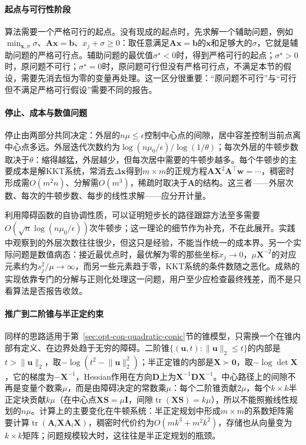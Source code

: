 \paragraph{起点与可行性阶段}
算法需要一个严格可行的起点。没有现成的起点时，先求解一个辅助问题，例如$\min_{\bm x,\sigma}\sigma$、$\bm A\bm x=\bm b$、$x_j+\sigma\geq0$：取任意满足$\bm A\bm x=\bm b$的$\bm x$和足够大的$\sigma$，它就是辅助问题的严格可行点。辅助问题的最优值$\sigma^\star<0$时，得到严格可行的起点；$\sigma^\star>0$时，原问题不可行；$\sigma^\star=0$时，原问题可行但没有严格可行点，不满足本节的假设，需要先消去恒为零的变量再处理。这一区分很重要：“原问题不可行”与“可行但不满足严格可行假设”需要不同的报告。

\paragraph{停止、成本与数值问题}
停止由两部分共同决定：外层的$n\mu\leq\epsilon$控制中心点的间隙，居中容差控制当前点离中心点多远。外层迭代次数约为$\log(n\mu_0/\epsilon)/\log(1/\theta)$；每次外层的牛顿步数取决于$\theta$：缩得越猛，外层越少，但每次居中需要的牛顿步越多。每个牛顿步的主要成本是解KKT系统，常消去$\Delta\bm x$得到$m\times m$的正规方程$\bm A\bm X^2\bm A^\top\bm w=\cdots$，稠密时形成需$O(m^2n)$、分解需$O(m^3)$，稀疏时取决于$\bm A$的结构。这三者——外层次数、每次的牛顿步数、每步的线性求解——应分开计量。

利用障碍函数的自协调性质，可以证明短步长的路径跟踪方法至多需要$O(\sqrt n\log(n\mu_0/\epsilon))$次牛顿步；这一理论的细节作为补充，不在此展开。实践中观察到的外层次数往往很少，但这只是经验，不能当作统一的成本界。另一个实际问题是数值病态：接近最优点时，最优解为零的那些坐标$x_j\to0$，$\mu\bm X^{-2}$的对应元素约为$s_j^2/\mu\to\infty$，而另一些元素趋于零，KKT系统的条件数随之恶化。成熟的实现依靠专门的分解与正则化处理这一问题，用户至少应检查最终残差，而不是只看算法是否报告收敛。

\paragraph{推广到二阶锥与半正定约束}
同样的思路适用于第~\ref{sec:opt-con-quadratic-conic}节的锥模型，只需换一个在锥内部有定义、在边界处趋于无穷的障碍。二阶锥$\{(\bm u,t):\lVert\bm u\rVert_2\leq t\}$的内部是$t>\lVert\bm u\rVert_2$，取$-\log(t^2-\lVert\bm u\rVert_2^2)$；半正定锥的内部是$\bm X\succ\bm0$，取$-\log\det\bm X$，它的梯度为$-\bm X^{-1}$，Hessian作用在方向$\bm D$上为$\bm X^{-1}\bm D\bm X^{-1}$。中心路径上的间隙不再是变量个数乘$\mu$，而是由障碍决定的常数乘$\mu$：每个二阶锥贡献$2\mu$，每个$k\times k$半正定块贡献$k\mu$（在中心点$\bm X\bm S=\mu\bm I$，间隙$\operatorname{tr}(\bm X\bm S)=k\mu$），所以不能照搬线性规划的$n\mu$。计算上的主要变化在牛顿系统：半正定规划中形成$m\times m$的系数矩阵需要计算$\operatorname{tr}(\bm A_i\bm X\bm A_l\bm X)$，稠密时代价约为$O(mk^3+m^2k^2)$，存储也从向量变为$k\times k$矩阵；问题规模较大时，这往往是半正定规划的瓶颈。

